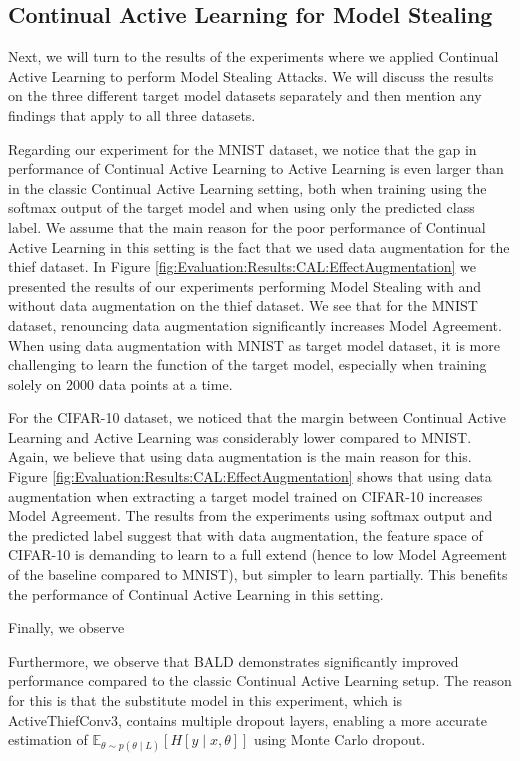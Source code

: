 \subsection{Continual Active Learning for Model Stealing}
\label{sec:Discussion:ModelStealing:CALMS}
Next, we will turn to the results of the experiments where we applied Continual Active Learning to perform Model Stealing Attacks. We will discuss the results on the three different target model datasets separately and then mention any findings that apply to all three datasets. \par
Regarding our experiment for the MNIST dataset, we notice that the gap in performance of Continual Active Learning to Active Learning is even larger than in the classic Continual Active Learning setting, both when training using the softmax output of the target model and when using 
only the predicted class label. We assume that the main reason for the poor performance of Continual Active Learning in this setting is the fact that we used data augmentation for the thief dataset. In Figure \ref{fig:Evaluation:Results:CAL:EffectAugmentation} we presented the results
of our experiments performing Model Stealing with and without data augmentation on the thief dataset. We see that for the MNIST dataset, renouncing data augmentation significantly increases Model Agreement. When using data augmentation with MNIST as target model dataset, it is more
challenging to learn the function of the target model, especially when training solely on 2000 data points at a time. \par
For the CIFAR-10 dataset, we noticed that the margin between Continual Active Learning and Active Learning was considerably lower compared to MNIST. Again, we believe that using data augmentation is the main reason for this. Figure \ref{fig:Evaluation:Results:CAL:EffectAugmentation}
shows that using data augmentation when extracting a target model trained on CIFAR-10 increases Model Agreement. The results from the experiments using softmax output and the predicted label suggest that with data augmentation, the feature space of CIFAR-10 is demanding to learn to a
full extend (hence to low Model Agreement of the baseline compared to MNIST), but simpler to learn partially. This benefits the performance of Continual Active Learning in this setting. \par
Finally, we observe



Furthermore, we observe that BALD demonstrates significantly improved performance
compared to the classic Continual Active Learning setup. The reason for this is that the substitute model in this experiment, which is ActiveThiefConv3, contains multiple dropout layers, enabling a more accurate estimation of $\mathbb{E}_{\theta \sim p(\theta \mid L)} [H[y \mid x, \theta]]$
using Monte Carlo dropout.

